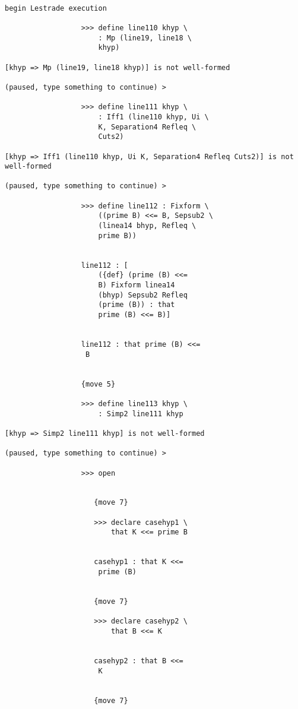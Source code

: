 \documentclass[12pt]{article}
\begin{document}
\begin{verbatim}

begin Lestrade execution

                  >>> define line110 khyp \
                      : Mp (line19, line18 \
                      khyp)

[khyp => Mp (line19, line18 khyp)] is not well-formed

(paused, type something to continue) >

                  >>> define line111 khyp \
                      : Iff1 (line110 khyp, Ui \
                      K, Separation4 Refleq \
                      Cuts2)

[khyp => Iff1 (line110 khyp, Ui K, Separation4 Refleq Cuts2)] is not well-formed

(paused, type something to continue) >

                  >>> define line112 : Fixform \
                      ((prime B) <<= B, Sepsub2 \
                      (linea14 bhyp, Refleq \
                      prime B))


                  line112 : [
                      ({def} (prime (B) <<= 
                      B) Fixform linea14 
                      (bhyp) Sepsub2 Refleq 
                      (prime (B)) : that 
                      prime (B) <<= B)]


                  line112 : that prime (B) <<= 
                   B


                  {move 5}

                  >>> define line113 khyp \
                      : Simp2 line111 khyp

[khyp => Simp2 line111 khyp] is not well-formed

(paused, type something to continue) >

                  >>> open


                     {move 7}

                     >>> declare casehyp1 \
                         that K <<= prime B


                     casehyp1 : that K <<= 
                      prime (B)


                     {move 7}

                     >>> declare casehyp2 \
                         that B <<= K


                     casehyp2 : that B <<= 
                      K


                     {move 7}


\end{verbatim}
\end{document}
